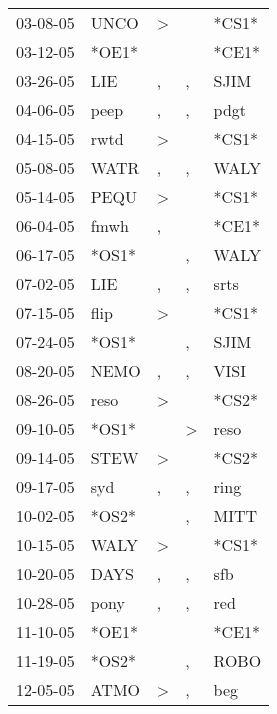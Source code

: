 \begin{supertabular}{lllll}
 03-08-05 &   UNCO &     \textgreater &                  &  *CS1* \\
 03-12-05 &  *OE1* &                  &                  &  *CE1* \\
 03-26-05 &    LIE &                , &                , &   SJIM \\
 04-06-05 &   peep &                , &                , &   pdgt \\
 04-15-05 &   rwtd &     \textgreater &                  &  *CS1* \\
 05-08-05 &   WATR &                , &                , &   WALY \\
 05-14-05 &   PEQU &     \textgreater &                  &  *CS1* \\
 06-04-05 &   fmwh &                , &                  &  *CE1* \\
 06-17-05 &  *OS1* &                  &                , &   WALY \\
 07-02-05 &    LIE &                , &                , &   srts \\
 07-15-05 &   flip &     \textgreater &                  &  *CS1* \\
 07-24-05 &  *OS1* &                  &                , &   SJIM \\
 08-20-05 &   NEMO &                , &                , &   VISI \\
 08-26-05 &   reso &     \textgreater &                  &  *CS2* \\
 09-10-05 &  *OS1* &                  &     \textgreater &   reso \\
 09-14-05 &   STEW &     \textgreater &                  &  *CS2* \\
 09-17-05 &    syd &                , &                , &   ring \\
 10-02-05 &  *OS2* &                  &                , &   MITT \\
 10-15-05 &   WALY &     \textgreater &                  &  *CS1* \\
 10-20-05 &   DAYS &                , &                , &    sfb \\
 10-28-05 &   pony &                , &                , &    red \\
 11-10-05 &  *OE1* &                  &                  &  *CE1* \\
 11-19-05 &  *OS2* &                  &                , &   ROBO \\
 12-05-05 &   ATMO &     \textgreater &                , &    beg \\

\end{supertabular}
